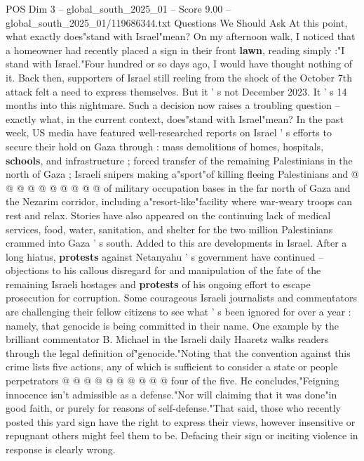 \begin{textsample}{POS Dim 3 – global\_south\_2025\_01 – Score 9.00 – global\_south\_2025\_01/119686344.txt}  \label{ex:f3_pos_406}
Questions We Should Ask At this point, what exactly does"stand with Israel"mean?
On my afternoon walk, I noticed that a homeowner had recently placed a sign in their front \textbf{lawn}, reading simply :"I stand with Israel."Four hundred or so days ago, I would have thought nothing of it.
Back then, supporters of Israel still reeling from the shock of the October 7th attack felt a need to express themselves.
But it ' s not December 2023.
It ' s 14 months into this nightmare.
Such a decision now raises a troubling question -- exactly what, in the current context, does"stand with Israel"mean?
In the past week, US media have featured well-researched reports on Israel ' s efforts to secure their hold on Gaza through : mass demolitions of homes, hospitals, \textbf{schools}, and infrastructure ; forced transfer of the remaining Palestinians in the north of Gaza ; Israeli snipers making a"sport"of killing fleeing Palestinians and @ @ @ @ @ @ @ @ @ @ of military occupation bases in the far north of Gaza and the Nezarim corridor, including a"resort-like"facility where war-weary troops can rest and relax.
Stories have also appeared on the continuing lack of medical services, food, water, sanitation, and shelter for the two million Palestinians crammed into Gaza ' s south.
Added to this are developments in Israel.
After a long hiatus, \textbf{protests} against Netanyahu ' s government have continued -- objections to his callous disregard for and manipulation of the fate of the remaining Israeli hostages and \textbf{protests} of his ongoing effort to escape prosecution for corruption.
Some courageous Israeli journalists and commentators are challenging their fellow citizens to see what ' s been ignored for over a year : namely, that genocide is being committed in their name.
One example by the brilliant commentator B.
Michael in the Israeli daily Haaretz walks readers through the legal definition of"genocide."Noting that the convention against this crime lists five actions, any of which is sufficient to consider a state or people perpetrators @ @ @ @ @ @ @ @ @ @ four of the five.
He concludes,"Feigning innocence isn't admissible as a defense."Nor will claiming that it was done"in good faith, or purely for reasons of self-defense."That said, those who recently posted this yard sign have the right to express their views, however insensitive or repugnant others might feel them to be.
Defacing their sign or inciting violence in response is clearly wrong.

\end{textsample}
